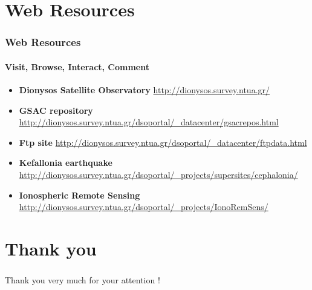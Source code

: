 \documentclass{beamer}
\begin{document}
\section{Web Resources}

\begin{frame}\frametitle{Web Resources}\framesubtitle{Visit, Browse, Interact, Comment}
\begin{itemize}
    \item \textbf{Dionysos Satellite Observatory} \url{http://dionysos.survey.ntua.gr/}  %
    \item \textbf{GSAC repository} \url{http://dionysos.survey.ntua.gr/dsoportal/_datacenter/gsacrepos.html} %
    \item \textbf{Ftp site} \url{http://dionysos.survey.ntua.gr/dsoportal/_datacenter/ftpdata.html}  %
    \item \textbf{Kefallonia earthquake} \url{http://dionysos.survey.ntua.gr/dsoportal/_projects/supersites/cephalonia/}  %
    \item \textbf{Ionospheric Remote Sensing} \url{http://dionysos.survey.ntua.gr/dsoportal/_projects/IonoRemSens/}  %
\end{itemize}
\end{frame}

\section{Thank you}
\begin{frame}\frametitle{}\framesubtitle{}
    \begin{center}
    Thank you very much for your attention !
    \end{center}
\end{frame}
\end{document}
